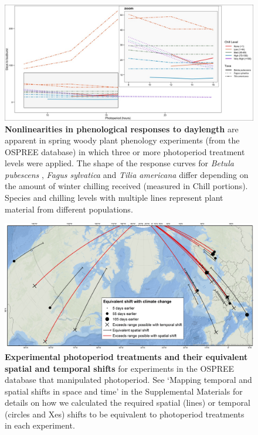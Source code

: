 \documentclass{article}
\begin{document}
\begin{figure}[p]
\includegraphics{..//..//analyses/photoperiod/figures/Photo_curv_FINAL.jpeg} 
\caption{\textbf{Nonlinearities in phenological responses to daylength} are apparent in spring woody plant phenology experiments (from the OSPREE database) in which three or more photoperiod treatment levels were applied. The shape of the response curves for \textit{Betula pubescens} \citep{Caffarra:2011b}, \textit{Fagus sylvatica} \citep{Heide:1993a} and \textit{Tilia americana} \citep{Ashby:1962aa} differ depending on the amount of winter chilling received (measured in Chill portions). Species and chilling levels with multiple lines represent plant material from different populations.}


 \label{fig:photocurve}
 \end{figure}


\begin{figure}[p]
\centering
\includegraphics{..//..//analyses/photoperiod/figures/ospree_photopmap_fromblake.jpg} 
\caption{\textbf{Experimental photoperiod treatments and their equivalent spatial and temporal shifts} for experiments in the OSPREE database that manipulated photoperiod. See `Mapping temporal and spatial shifts in space and time' in the Supplemental Materials for details on how we calculated the required spatial (lines) or temporal (circles and Xes) shifts to be equivalent to photoperiod treatments in each experiment.}
 \label{fig:photomap}
 \end{figure}
\end{document}
